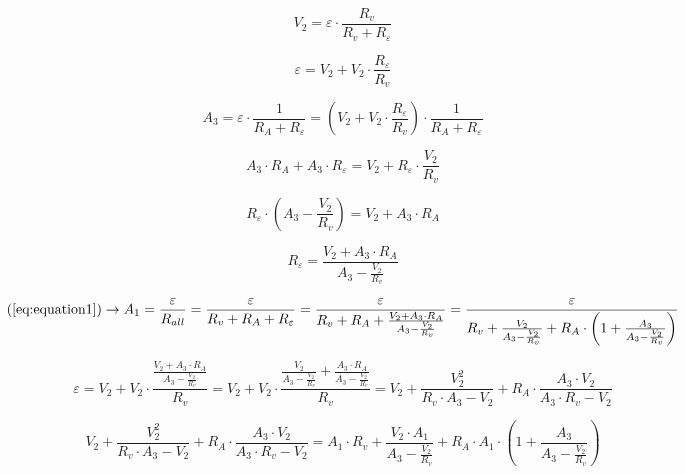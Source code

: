 \documentclass[12pt]{memoir}
\begin{document}
    \begin{equation}
        V_2 = \varepsilon \cdot \frac{R_v}{R_v + R_\varepsilon}\label{eq:equation3}
    \end{equation}

    \begin{equation*}
        \varepsilon = V_2 + V_2 \cdot \frac{R_\varepsilon}{R_v}
    \end{equation*}

    \begin{equation}
        A_3 = \varepsilon \cdot \frac{1}{R_A + R_\varepsilon} = \left(V_2 + V_2 \cdot \frac{R_\varepsilon}{R_v}\right) \cdot \frac{1}{R_A + R_\varepsilon} \label{eq:equation4}
    \end{equation}

    \begin{equation*}
        A_3 \cdot R_A + A_3 \cdot R_\varepsilon = V_2 + R_\varepsilon \cdot \frac{V_2}{R_v}
    \end{equation*}

    \begin{equation*}
        R_\varepsilon \cdot \left( A_3 - \frac{V_2}{R_v} \right) = V_2 + A_3 \cdot R_A
    \end{equation*}

    \begin{equation*}
        R_\varepsilon = \frac{V_2 + A_3 \cdot R_A}{A_3 - \frac{V_2}{R_v}}
    \end{equation*}

    \begin{equation*}
        \left(\ref{eq:equation1} \right) \rightarrow A_1 = \frac{\varepsilon}{R_{all}} = \frac{\varepsilon}{R_v + R_A + R_\varepsilon} = \frac{\varepsilon}{R_v + R_A + \frac{V_2 + A_3 \cdot R_A}{A_3 - \frac{V_2}{R_v}}} = \frac{\varepsilon}{R_v + \frac{V_2}{A_3 - \frac{V_2}{R_v}} + R_A \cdot \left( 1 + \frac{A_3}{A_3 - \frac{V_2}{R_v}} \right)}
    \end{equation*}

    \begin{equation*}
        \varepsilon = V_2 + V_2 \cdot \frac{\frac{V_2 + A_3 \cdot R_A}{A_3 - \frac{V_2}{R_v}}}{R_v} = V_2 + V_2 \cdot \frac{\frac{V_2}{A_3 - \frac{V_2}{R_v}} + \frac{A_3 \cdot R_A}{A_3 - \frac{V_2}{R_v}}}{R_v} = V_2 + \frac{V_2^2}{R_v \cdot A_3 - V_2} + R_A \cdot \frac{A_3 \cdot V_2}{A_3 \cdot R_v - V_2}
    \end{equation*}

    \begin{equation*}
        V_2 + \frac{V_2^2}{R_v \cdot A_3 - V_2} + R_A \cdot \frac{A_3 \cdot V_2}{A_3 \cdot R_v - V_2} = A_1 \cdot R_v + \frac{V_2 \cdot A_1}{A_3 - \frac{V_2}{R_v}} + R_A \cdot A_1 \cdot \left( 1 + \frac{A_3}{A_3 - \frac{V_2}{R_v}} \right)
    \end{equation*}
\end{document}

